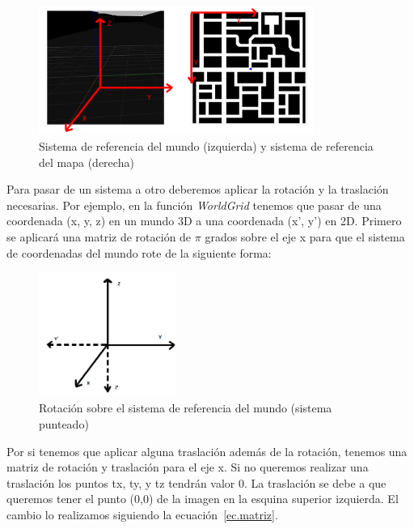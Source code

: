\begin{figure}[H]
  \begin{center}
    \includegraphics[width=0.8\textwidth]{figures/GPP/referencias.png}
		\caption{Sistema de referencia del mundo (izquierda) y sistema de referencia del mapa (derecha)}
		\label{fig.sistemaref}
		\end{center}
\end{figure}

Para pasar de un sistema a otro deberemos aplicar la rotación y la traslación necesarias. Por ejemplo, en la función \textit{WorldGrid} tenemos que pasar de una coordenada (x, y, z) en un mundo 3D a una coordenada (x’, y’) en 2D. Primero se aplicará una matriz de rotación de \(\pi\) grados sobre el eje x para que el sistema de coordenadas del mundo rote de la siguiente forma:

\begin{figure}[H]
  \begin{center}
    \includegraphics[width=0.4\textwidth]{figures/GPP/Sistema3DRot.png}
		\caption{Rotación sobre el sistema de referencia del mundo (sistema punteado)}
		\label{fig.sistema3DRot}
		\end{center}
\end{figure}

Por si tenemos que aplicar alguna traslación además de la rotación, tenemos una matriz de rotación y traslación para el eje x. Si no queremos realizar una traslación los puntos tx, ty, y tz tendrán valor 0. La traslación se debe a que queremos tener el punto (0,0) de la imagen en la esquina superior izquierda. El cambio lo realizamos siguiendo la ecuación~\ref{ec.matriz}.

